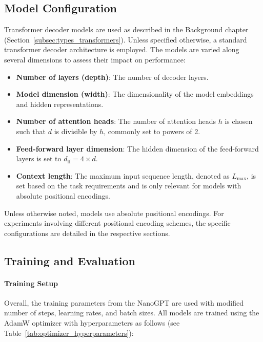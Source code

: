 \subsection{Model Configuration}

Transformer decoder models are used as described in the Background chapter (Section~\ref{subsec:types_transformers}). Unless specified otherwise, a standard transformer decoder architecture is employed. The models are varied along several dimensions to assess their impact on performance:

\begin{itemize}
    \item \textbf{Number of layers (depth)}: The number of decoder layers.
    \item \textbf{Model dimension (width)}: The dimensionality of the model embeddings and hidden representations.
    \item \textbf{Number of attention heads}: The number of attention heads $h$ is chosen such that $d$ is divisible by $h$, commonly set to powers of 2.
    \item \textbf{Feed-forward layer dimension}: The hidden dimension of the feed-forward layers is set to $d_{\text{ff}} = 4 \times d$.
    \item \textbf{Context length}: The maximum input sequence length, denoted as $L_{\text{max}}$, is set based on the task requirements and is only relevant for models with absolute positional encodings.
\end{itemize}

Unless otherwise noted, models use absolute positional encodings. For experiments involving different positional encoding schemes, the specific configurations are detailed in the respective sections.

\subsection{Training and Evaluation}

\paragraph{Training Setup}
Overall, the training parameters from the NanoGPT \parencite{karpathy_nanogpt_2022} are used with modified number of steps, learning rates, and batch sizes. All models are trained using the AdamW optimizer with hyperparameters as follows (see Table~\ref{tab:optimizer_hyperparameters}):


